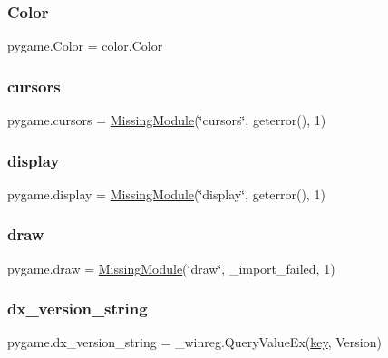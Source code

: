 \subsubsection{\texorpdfstring{Color}{Color}}
{\footnotesize\ttfamily pygame.\+Color = color.\+Color}

\mbox{\label{namespacepygame_a6d9d257e6de5d3cdfe8cf6d89b1b1471}} 
\subsubsection{\texorpdfstring{cursors}{cursors}}
{\footnotesize\ttfamily pygame.\+cursors = \hyperlink{classpygame_1_1_missing_module}{Missing\+Module}(\char`\"{}cursors\char`\"{}, geterror(), 1)}

\mbox{\label{namespacepygame_aa1cf8c6beba55ddbc783465d6572b666}} 
\subsubsection{\texorpdfstring{display}{display}}
{\footnotesize\ttfamily pygame.\+display = \hyperlink{classpygame_1_1_missing_module}{Missing\+Module}(\char`\"{}display\char`\"{}, geterror(), 1)}

\mbox{\label{namespacepygame_a8802baedc6d0a922faa3d799ece5bae5}} 
\subsubsection{\texorpdfstring{draw}{draw}}
{\footnotesize\ttfamily pygame.\+draw = \hyperlink{classpygame_1_1_missing_module}{Missing\+Module}(\char`\"{}draw\char`\"{}, \+\_\+import\+\_\+failed, 1)}

\mbox{\label{namespacepygame_adccef28882b2d4da0cf53454b5384604}} 
\subsubsection{\texorpdfstring{dx\+\_\+version\+\_\+string}{dx\_version\_string}}
{\footnotesize\ttfamily pygame.\+dx\+\_\+version\+\_\+string = \+\_\+winreg.\+Query\+Value\+Ex(\hyperlink{namespacepygame_a605356bb276b22993417ce95f178ab1d}{key}, \textquotesingle{}Version\textquotesingle{})}

